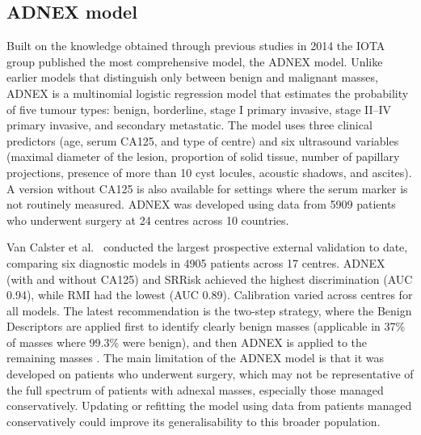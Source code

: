 \subsection{ADNEX model}

Built on the knowledge obtained through previous studies in 2014 the IOTA group published the most comprehensive model, the \gls{ADNEX} model\cite{vancalsterEvaluatingRiskOvarian2014}. Unlike earlier models that distinguish only between benign and malignant masses, \gls{ADNEX} is a multinomial logistic regression model that estimates the probability of five tumour types: benign, borderline, stage I primary invasive, stage II--IV primary invasive, and secondary metastatic. The model uses three clinical predictors (age, serum \gls{CA125}, and type of centre) and six ultrasound variables (maximal diameter of the lesion, proportion of solid tissue, number of papillary projections, presence of more than 10 cyst locules, acoustic shadows, and ascites). A version without \gls{CA125} is also available for settings where the serum marker is not routinely measured. \gls{ADNEX} was developed using data from 5909 patients who underwent surgery at 24 centres across 10 countries. 

Van Calster et al.\ \cite{vancalsterValidationModelsDiagnose2020} conducted the largest prospective external validation to date, comparing six diagnostic models in 4905 patients across 17 centres. \gls{ADNEX} (with and without \gls{CA125}) and \gls{SRRisk} achieved the highest discrimination (\gls{AUC} 0.94), while \gls{RMI} had the lowest (\gls{AUC} 0.89). Calibration varied across centres for all models. The latest recommendation is the two-step strategy, where the Benign Descriptors are applied first to identify clearly benign masses (applicable in 37\% of masses where 99.3\% were benign), and then \gls{ADNEX} is applied to the remaining masses \cite{landolfoBenignDescriptorsADNEX2023}. The main limitation of the ADNEX model is that it was developed on patients who underwent surgery, which may not be representative of the full spectrum of patients with adnexal masses, especially those managed conservatively. Updating or refitting the model using data from patients managed conservatively could improve its generalisability to this broader population.

